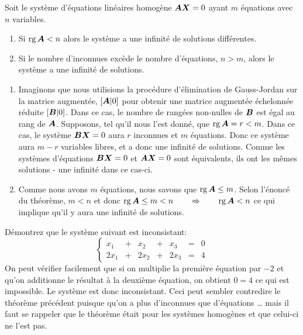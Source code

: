\begin{theo} \label{theoreme2}
	Soit le système d'équations linéaires homogène $\boldsymbol{A}\boldsymbol{X} = 0$ ayant $m$ équations avec $n$ variables.
	\begin{enumerate}
	\item Si $\operatorname{rg}{\boldsymbol{A}} < n$ alors le système a une infinité de solutions différentes. 
	\item Si le nombre d'inconnues excède le nombre d'équations, $n > m$, alors le système a
	une infinité de solutions.
	\end{enumerate}

\proof
\begin{enumerate}
    \item Imaginons que nous utilisions la procédure d'élimination de Gauss-Jordan sur
    la matrice augmentée, $[\boldsymbol{A}|0]$ pour obtenir une matrice augmentée échelonnée réduite
    $[\boldsymbol{B}|0]$.  Dans ce cas, le nombre de rangées non-nulles de $\boldsymbol{B}$ est égal au rang de $\boldsymbol{A}$.
    Supposons, tel qu'il nous l'est donné, que $\operatorname{rg}{\boldsymbol{A}} = r < m$. 
    Dans ce cas, le système $\boldsymbol{B}\boldsymbol{X}=0$ aura
    $r$ inconnues et $m$ équations.  Donc ce système aura $m-r$ variables libres, et a donc une
    infinité de solutions. Comme les systèmes d'équations $\boldsymbol{B}\boldsymbol{X}=0$ et $\boldsymbol{A}\boldsymbol{X}=0$ sont équivalents,
    ils ont les mêmes solutions - une infinité dans ce cas-ci.

	\item Comme nous avons $m$ équations, nous savons que $\operatorname{rg}{\boldsymbol{A}} \leq m$. Selon l'énoncé du
	théorème, $m <n$ et donc 
	$
	\operatorname{rg}{\boldsymbol{A}} \leq m < n \qquad \Rightarrow \qquad \operatorname{rg}{\boldsymbol{A}} < n
	$
	ce qui implique qu'il y aura une infinité de solutions.
	\end{enumerate}
\end{theo}

\begin{exemple}
	Démontrez que le système suivant est inconsistant:
	\[
	\left\{
	\begin{matrix}
	x_1 &+& x_2 &+& x_3 &=& 0 \\
	2x_1 &+& 2x_2 &+& 2x_3 &=& 4
	\end{matrix}
	\right.
	\]
\solution
	On peut vérifier facilement que si on multiplie la première équation par $-2$ et qu'on additionne le résultat
	à la deuxième équation, on obtient $0=4$ ce qui est impossible. Le système est donc inconsistant.  Ceci
	peut sembler contredire le théorème précédent puisque qu'on a plus d'inconnues que d'équations \ldots
	mais il faut se rappeler que le théorème était pour les systèmes homogènes et que celui-ci ne l'est pas.
\end{exemple}

